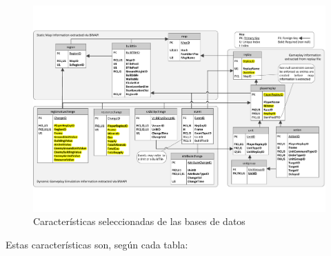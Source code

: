 \documentclass[a4paper,11pt]{book}\usepackage[]{graphicx}\usepackage[]{color}
\makeatletter
\def\maxwidth{ %
  \ifdim\Gin@nat@width>\linewidth
    \linewidth
  \else
    \Gin@nat@width
  \fi
}
\makeatother
\begin{document}
\begin{figure}
    \centering
    \includegraphics[width=\maxwidth]{figure/Robertson14DatabaseDiagramSeleccion}
    \caption{Características seleccionadas de las bases de datos}
    \label{datasetSeleccionado}
\end{figure}


Estas características son, según cada tabla:
\end{document}
